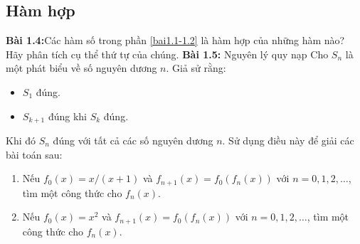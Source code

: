 \subsection*{Hàm hợp}
\textbf{Bài 1.4:}Các hàm số trong phần \ref{bai1.1-1.2} là hàm hợp của những hàm nào? Hãy phân tích cụ thể thứ tự của chúng.
\textbf{Bài 1.5\star:} Nguyên lý quy nạp\newline
Cho $S_n$ là một phát biểu về số nguyên dương $n$. Giả sử rằng:
\begin{itemize}
    \item $S_1$ đúng.
    \item $S_{k+1}$ đúng khi $S_k$ đúng.
\end{itemize}
Khi đó $S_n$ đúng với tất cả các số nguyên dương $n$.\newline
Sử dụng điều này để giải các bài toán sau:
\begin{enumerate}[label=(\alph*)]
\item Nếu $f_0(x) =x/(x+1)$ và $f_{n+1}(x)=f_0(f_n(x))$ với $n=0, 1, 2,\dots$, tìm một công thức cho $f_n(x)$.
\item Nếu $f_0(x) =x^2$ và $f_{n+1}(x)=f_0(f_n(x))$ với $n=0, 1, 2,\dots$, tìm một công thức cho $f_n(x)$.
\end{enumerate}




